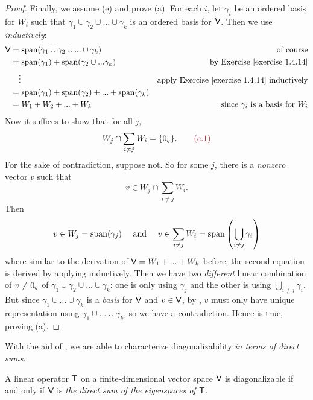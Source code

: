 \begin{proof}
Finally, we assume (e) and prove (a).
For each \(i\), let \(\gamma_i\) be an ordered basis for \(W_i\) such that \(\gamma_1 \cup \gamma_2 \cup ... \cup \gamma_k\) is an ordered basis for \(\textsf{V}\).
Then we use  \emph{inductively}:
\begin{align*}
    \V & = \spann(\gamma_1 \cup \gamma_2 \cup ... \cup \gamma_k) & \text{of course} \\
      & = \spann(\gamma_1) + \spann(\gamma_2 \cup ... \gamma_k) & \text{by \EXEC{1.4.14}} \\
      & \quad \vdots & \text{apply \EXEC{1.4.14} inductively} \\
      & = \spann(\gamma_1) + \spann(\gamma_2) + ... + \spann(\gamma_k) \\
      & = W_1 + W_2 + ... + W_k & \text{since \(\gamma_i\) is a basis for \(W_i\)}
\end{align*}
Now it suffices to show that for all \(j\),
\[
    W_j \cap \sum_{i \ne j} W_{i} = \{ \OV \}. \quad \quad \MAROON{(e.1)}
\]
For the sake of contradiction, suppose not.
So for some \(j\), there is a \emph{nonzero} vector \(v\) such that
\[
    v \in W_j \cap \sum_{i \ne j} W_i.
\]
Then
\[
    v \in W_j = \operatorname{span}(\gamma_j)
    \quad \text{ and } \quad
    v \in \sum_{i \ne j} W_i = \operatorname{span} \left( \bigcup_{i \ne j} \gamma_i \right)
\]
where similar to the derivation of \(\textsf{V} = W_1 + ... + W_k\) before, the second equation is derived by applying  inductively.
Then we have two \emph{different} linear combination of \(v \ne 0_{_{\textsf{V}}}\) of \(\gamma_1 \cup \gamma_2 \cup ... \cup \gamma_k\): one is only using \(\gamma_j\) and the other is using \(\bigcup_{i \ne j} \gamma_i\).
But since \(\gamma_1 \cup ... \cup \gamma_k\) is a \emph{basis} for \(\textsf{V}\) and \(v \in \textsf{V}\), by , \(v\) must only have unique representation using \(\gamma_1 \cup ... \cup \gamma_k\), so we have a contradiction.
Hence  is true, proving (a).
\end{proof}

With the aid of , we are able to characterize diagonalizability \emph{in terms of direct sums}.

\begin{theorem} \label{thm 5.10}
A linear operator \(\textsf{T}\) on a finite-dimensional vector space \(\textsf{V}\) is diagonalizable if and only if \(\textsf{V}\) is \emph{the direct sum of the eigenspaces of \(\textsf{T}\)}.
\end{theorem}

